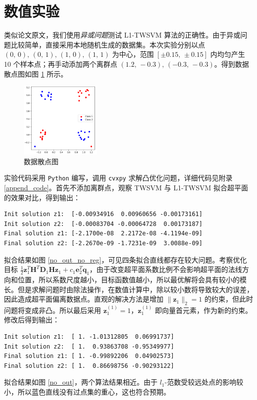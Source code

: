 \section{数值实验}

类似论文原文，我们使用\emph{异或问题}测试 L1-TWSVM 算法的正确性。由于异或问题比较简单，直接采用本地随机生成的数据集。本次实验分别以点 $(0,\,0),\, (0,\,1),\, (1,\,0),\, (1,\,1)$ 为中心，范围 $[\pm 0.15,\, \pm 0.15]$ 内均匀产生 10 个样本点；再手动添加两个离群点 $(1.2,\, -0.3),\, (-0.3,\, -0.3)$。得到数据散点图如图 \ref{data_points} 所示。

\begin{figure}[ht]
\centering
\includegraphics[width=0.35\textwidth]{./img/datas.png}
\caption{数据散点图}
\label{data_points}
\end{figure}

实验代码采用 \verb|Python| 编写，调用 \verb|cvxpy| \parencite{cvxpy} 求解凸优化问题，详细代码见附录 \ref{append_code}。首先不添加离群点，观察 TWSVM 与 L1-TWSVM 拟合超平面的效果对比，得到输出：
\begin{verbatim}
Init solution z1:  [-0.00934916  0.00960656 -0.00173161]
Init solution z2:  [-0.00083704 -0.00064728  0.00173187]
Final solution z1: [-2.1700e-08  2.2172e-08 -4.1194e-09]
Final solution z2: [-2.2670e-09 -1.7231e-09  3.0088e-09]
\end{verbatim}
拟合结果如图 \ref{no_out_no_reg}，可见四条拟合直线都存在较大问题。考察优化目标 $\frac{1}{2}\mathbf{z}_1^T \mathbf{H}^T \mathbf{D}_1 \mathbf{H} \mathbf{z}_1 + c_1 \mathbf{e}_2^T \mathbf{q}_1$，由于改变超平面系数比例不会影响超平面的法线方向和位置，所以系数尺度越小，目标函数值越小，所以最优解将会具有较小的模长。但是求解问题时由除法操作，在数值计算中，除以较小数将导致较大的误差，因此造成超平面偏离数据点。直观的解决方法是增加 $\|\mathbf{z}_1\|_2 = 1$ 的约束，但此时问题将变成非凸。所以最后采用 $\mathbf{z}_1^{(1)} = 1$，$\mathbf{z}_1^{(1)}$ 即向量首元素，作为新的约束。修改后得到输出：
\begin{verbatim}
Init solution z1:  [ 1. -1.01312805  0.06991737]
Init solution z2:  [ 1.  0.93863708 -0.95349977]
Final solution z1: [ 1. -0.99892206  0.04902573]
Final solution z2: [ 1.  0.86698756 -0.90293122]
\end{verbatim}
拟合结果如图 \ref{no_out}，两个算法结果相近。由于 $l_1$-范数受较远处点的影响较小，所以蓝色直线没有过点集的重心，这也符合预期。

